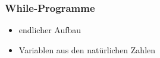 \documentclass{lehramt-informatik-haupt}
\begin{document}
\subsubsection{While-Programme}

\begin{liQuellen}
\item \cite[Seite 7-12]{theo:fs:4}
\item \cite[Seite 260-264]{hoffmann}
\item \cite{wiki:while}
\end{liQuellen}

\begin{itemize}
\item endlicher Aufbau
\item Variablen aus den natürlichen Zahlen
\end{itemize}
\end{document}
